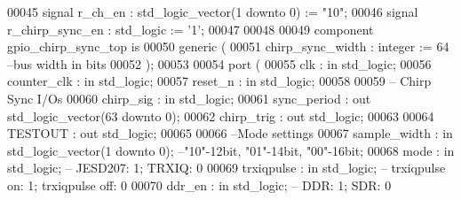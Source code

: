 \begin{DoxyCode}
00045     \textcolor{keywordflow}{signal} \textcolor{vhdlchar}{r_ch_en}              \textcolor{vhdlchar}{:} \textcolor{comment}{std\_logic\_vector}\textcolor{vhdlchar}{(}\textcolor{vhdllogic}{}\textcolor{vhdllogic}{1} \textcolor{keywordflow}{downto} \textcolor{vhdllogic}{}\textcolor{vhdllogic}{0}\textcolor{vhdlchar}{)} \textcolor{vhdlchar}{:=} \textcolor{vhdllogic}{"10"};
00046     \textcolor{keywordflow}{signal} \textcolor{vhdlchar}{r_chirp_sync_en}  \textcolor{vhdlchar}{:} \textcolor{comment}{std\_logic} \textcolor{vhdlchar}{:=} \textcolor{vhdlchar}{'}\textcolor{vhdllogic}{}\textcolor{vhdllogic}{1}\textcolor{vhdlchar}{'};
00047 
00048 
00049     \textcolor{keywordflow}{component} gpio_chirp_sync_top \textcolor{keywordflow}{is}
00050     \textcolor{keywordflow}{generic} (
00051     chirp_sync_width        : \textcolor{comment}{integer} := \textcolor{vhdllogic}{}\textcolor{vhdllogic}{64}\textcolor{keyword}{ --bus width in bits }
00052     );
00053 
00054     \textcolor{keywordflow}{port} (
00055         clk                 : \textcolor{keywordflow}{in} \textcolor{comment}{std\_logic};
00056         counter_clk             : \textcolor{keywordflow}{in} \textcolor{comment}{std\_logic};
00057         reset_n             : \textcolor{keywordflow}{in} \textcolor{comment}{std\_logic};
00058 
00059 \textcolor{keyword}{        -- Chirp Sync I/Os}
00060         chirp_sig               : \textcolor{keywordflow}{in} \textcolor{comment}{std\_logic};
00061         sync_period             : \textcolor{keywordflow}{out} \textcolor{comment}{std\_logic\_vector}(\textcolor{vhdllogic}{}\textcolor{vhdllogic}{63} \textcolor{keywordflow}{downto} \textcolor{vhdllogic}{}\textcolor{vhdllogic}{0});
00062         chirp_trig              : \textcolor{keywordflow}{out} \textcolor{comment}{std\_logic};
00063     
00064         TESTOUT                 : \textcolor{keywordflow}{out} \textcolor{comment}{std\_logic};
00065             
00066 \textcolor{keyword}{        --Mode settings}
00067         sample_width         : \textcolor{keywordflow}{in} \textcolor{comment}{std\_logic\_vector}(\textcolor{vhdllogic}{}\textcolor{vhdllogic}{1} \textcolor{keywordflow}{downto} \textcolor{vhdllogic}{}\textcolor{vhdllogic}{0}); \textcolor{keyword}{--"10"-12bit, "01"-14bit, "00"-16bit;}
00068         mode                 : \textcolor{keywordflow}{in} \textcolor{comment}{std\_logic}; \textcolor{keyword}{-- JESD207: 1; TRXIQ: 0}
00069         trxiqpulse           : \textcolor{keywordflow}{in} \textcolor{comment}{std\_logic}; \textcolor{keyword}{-- trxiqpulse on: 1; trxiqpulse off: 0}
00070         ddr_en               : \textcolor{keywordflow}{in} \textcolor{comment}{std\_logic}; \textcolor{keyword}{-- DDR: 1; SDR: 0}

\end{DoxyCode}
